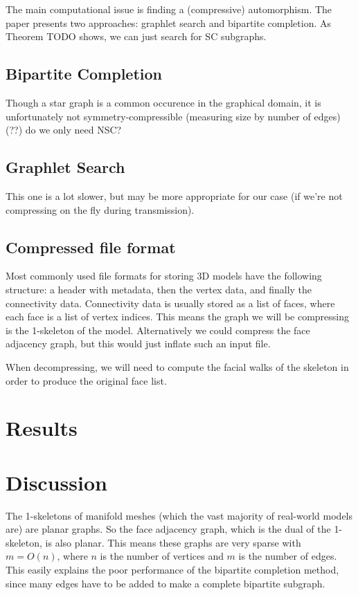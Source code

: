 \documentclass{egpubl}
\begin{document}


The main computational issue is finding a (compressive) automorphism. The paper presents two approaches: graphlet search and bipartite completion.
As Theorem TODO shows, we can just search for SC subgraphs.

\subsection{Bipartite Completion}

Though a star graph is a common occurence in the graphical domain, it is unfortunately not symmetry-compressible (measuring size by number of edges) (??) do we only need NSC?

\subsection{Graphlet Search}
This one is a lot slower, but may be more appropriate for our case (if we're not compressing on the fly during transmission).

\subsection{Compressed file format}
Most commonly used file formats for storing 3D models have the following structure: a header with metadata, then the vertex data, and finally the connectivity data. Connectivity data is usually stored as a list of faces, where each face is a list of vertex indices. This means the graph we will be compressing is the 1-skeleton of the model. Alternatively we could compress the face adjacency graph, but this would just inflate such an input file.

When decompressing, we will need to compute the facial walks of the skeleton in order to produce the original face list.

\section{Results}


\section{Discussion}

The 1-skeletons of manifold meshes (which the vast majority of real-world models are) are planar graphs. So the face adjacency graph, which is the dual of the 1-skeleton, is also planar. This means these graphs are very sparse with $m = O(n)$, where $n$ is the number of vertices and $m$ is the number of edges. This easily explains the poor performance of the bipartite completion method, since many edges have to be added to make a complete bipartite subgraph.  
\end{document}
